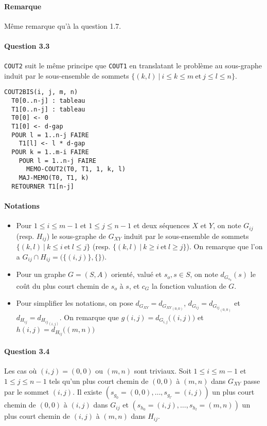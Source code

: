 \paragraph{Remarque}
M\^eme remarque qu'\`a la question 1.7.

\paragraph{Question 3.3}
\verb'COUT2' suit le m\^eme principe que \verb'COUT1' en translatant
le probl\`eme au sous-graphe induit par le sous-ensemble de sommets
$\big\{(k,l)\ \big|\ i\leq k\leq m\ \text{et}\ j\leq l\leq n\big\}$.
\begin{verbatim}
COUT2BIS(i, j, m, n)
  T0[0..n-j] : tableau
  T1[0..n-j] : tableau
  T0[0] <- 0
  T1[0] <- d-gap
  POUR l = 1..n-j FAIRE
    T1[l] <- l * d-gap
  POUR k = 1..m-i FAIRE
    POUR l = 1..n-j FAIRE
      MEMO-COUT2(T0, T1, 1, k, l)
    MAJ-MEMO(T0, T1, k)
  RETOURNER T1[n-j]
\end{verbatim}
\paragraph{Notations}
\begin{itemize}
\item Pour $1\leq i\leq m-1$ et $1\leq j\leq n-1$ et deux s\'equences
  $X$ et $Y$, on note $G_{ij}$ (resp. $H_{ij}$) le sous-graphe de
  $G_{XY}$ induit par le sous-ensemble de sommets
  $\big\{(k,l)\ |\ k\leq i\ \text{et}\ l\leq j\big\}$
  (resp. $\big\{(k,l)\ |\ k\geq i\ \text{et}\ l\geq j\big\}$).
  On remarque que l'on a $G_{ij}\cap H_{ij}=\big(\{(i,j)\},\{\}\big)$.
\item Pour un graphe $G=(S,A)$ orient\'e, valu\'e et $s_o,s\in S$, on
  note $d_{G_{s_0}}(s)$ le co\^ut du plus court chemin de $s_o$ \`a
  $s$, et $c_G$ la fonction valuation de $G$.
\item Pour simplifier les notations, on pose
  $d_{G_{XY}}=d_{{G_{XY}}_{(0,0)}}$, $d_{G_{ij}}=d_{{G_{ij}}_{(0,0)}}$
  et $d_{H_{ij}}=d_{{H_{ij}}_{(i,j)}}$. On remarque que
  $g(i,j)=d_{G_{i,j}}\big((i,j)\big)$ et
  $h(i,j)=d_{H_{ij}}\big((m,n)\big)$
\end{itemize}

\paragraph{Question 3.4}
Les cas o\`u $(i,j)=(0,0)$ ou $(m,n)$ sont triviaux. Soit
$1\leq i\leq m-1$ et $1\leq j\leq n-1$ tels qu'un plus court
chemin de $(0,0)$ \`a $(m,n)$ dans $G_{XY}$ passe par le sommet
$(i,j)$. Il existe $(s_{g_0}=(0,0),\ldots,s_{g_{l'}}=(i,j))$ un plus
court chemin de $(0,0)$ \`a $(i,j)$ dans $G_{ij}$ et
$(s_{h_0}=(i,j),\ldots,s_{h_l}=(m,n))$ un plus court chemin de $(i,j)$
\`a $(m,n)$ dans $H_{ij}$.
 
\pagebreak

